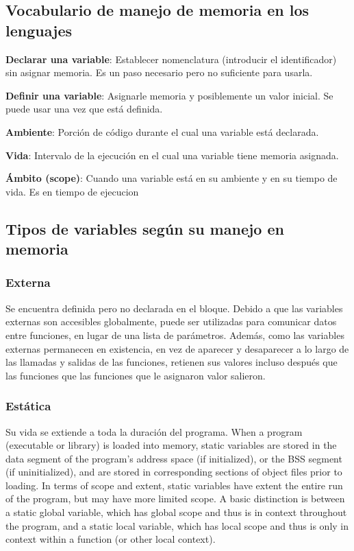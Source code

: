 \documentclass[a4paper, twoside]{article}
\begin{document}
\subsection{Vocabulario de manejo de memoria en los lenguajes}
\textbf{Declarar una variable}:
Establecer nomenclatura (introducir el identificador) sin asignar memoria. Es un paso necesario pero no suficiente para usarla. 

\textbf{Definir una variable}:
Asignarle memoria y posiblemente un valor inicial. Se puede usar una vez que está definida.

\textbf{Ambiente}:
Porción de código durante el cual una variable está declarada.

\textbf{Vida}:
Intervalo de la ejecución en el cual una variable tiene memoria asignada.

\textbf{Ámbito (scope)}:
Cuando una variable está en su ambiente y en su tiempo de vida. Es en tiempo de ejecucion

\subsection{Tipos de variables según su manejo en memoria}
\subsubsection{Externa}
Se encuentra definida pero no declarada en el bloque.
Debido a que las variables externas son accesibles globalmente, puede ser utilizadas para comunicar datos entre funciones, en lugar de una lista de parámetros.
Además, como las variables externas permanecen en existencia, en vez de aparecer y desaparecer a lo largo de las llamadas y salidas de las funciones, retienen sus valores incluso después que las funciones que las funciones que le asignaron valor salieron.

\subsubsection{Estática}
Su vida se extiende a toda la duración del programa.
When a program (executable or library) is loaded into memory, static variables are stored in the data segment of the program's address space (if initialized), or the BSS segment (if uninitialized), and are stored in corresponding sections of object files prior to loading.
In terms of scope and extent, static variables have extent the entire run of the program, but may have more limited scope. A basic distinction is between a static global variable, which has global scope and thus is in context throughout the program, and a static local variable, which has local scope and thus is only in context within a function (or other local context).
\end{document}
